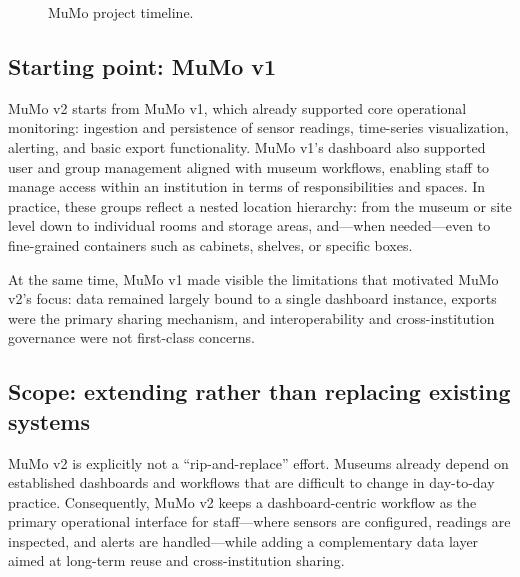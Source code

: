 \begin{figure}[h]
\caption{MuMo project timeline.}
\label{fig:timeline}
\end{figure}

\subsection{Starting point: MuMo v1}\label{starting-point-mumo-v1}

MuMo v2 starts from MuMo v1, which already supported core operational
monitoring: ingestion and persistence of sensor readings, time-series
visualization, alerting, and basic export functionality. MuMo v1's
dashboard also supported user and group management aligned with museum
workflows, enabling staff to manage access within an institution in
terms of responsibilities and spaces. In practice, these groups reflect
a nested location hierarchy: from the museum or site level down to
individual rooms and storage areas, and---when needed---even to
fine-grained containers such as cabinets, shelves, or specific boxes.

At the same time, MuMo v1 made visible the limitations that motivated
MuMo v2's focus: data remained largely bound to a single dashboard
instance, exports were the primary sharing mechanism, and
interoperability and cross-institution governance were not first-class
concerns.

\subsection{Scope: extending rather than replacing existing
systems}\label{scope-extending-rather-than-replacing-existing-systems}

MuMo v2 is explicitly not a ``rip-and-replace'' effort. Museums already
depend on established dashboards and workflows that are difficult to
change in day-to-day practice. Consequently, MuMo v2 keeps a
dashboard-centric workflow as the primary operational interface for
staff---where sensors are configured, readings are inspected, and alerts
are handled---while adding a complementary data layer aimed at long-term
reuse and cross-institution sharing.

